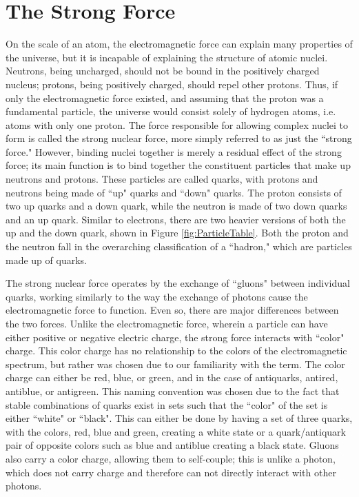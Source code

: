 \section{The Strong Force} \label{sec:StrongForce}
On the scale of an atom, the electromagnetic force can explain many properties of the universe, but it is incapable of explaining the structure of atomic nuclei. Neutrons, being uncharged, should not be bound in the positively charged nucleus; protons, being positively charged, should repel other protons. Thus, if only the electromagnetic force existed, and assuming that the proton was a fundamental particle, the universe would consist solely of hydrogen atoms, i.e. atoms with only one proton. The force responsible for allowing complex nuclei to form is called the strong nuclear force, more simply referred to as just the ``strong force." However, binding nuclei together is merely a residual effect of the strong force; its main function is to bind together the constituent particles that make up neutrons and protons. These particles are called quarks, with protons and neutrons being made of ``up" quarks and ``down" quarks. The proton consists of two up quarks and a down quark, while the neutron is made of two down quarks and an up quark. Similar to electrons, there are two heavier versions of both the up and the down quark, shown in Figure \ref{fig:ParticleTable}. Both the proton and the neutron fall in the overarching classification of a ``hadron," which are particles made up of quarks.\par 

	The strong nuclear force operates by the exchange of ``gluons" between individual quarks, working similarly to the way the exchange of photons cause the electromagnetic force to function. Even so, there are major differences between the two forces. Unlike the electromagnetic force, wherein a particle can have either positive or negative electric charge, the strong force interacts with ``color" charge. This color charge has no relationship to the colors of the electromagnetic spectrum, but rather was chosen due to our familiarity with the term.  The color charge can either be red, blue, or green, and in the case of antiquarks, antired, antiblue, or antigreen. This naming convention was chosen due to the fact that stable combinations of quarks exist in sets such that the ``color" of the set is either ``white" or ``black". This can either be done by having a set of three quarks, with the colors, red, blue and green, creating a white state or a quark/antiquark pair of opposite colors such as blue and antiblue creating a black state. Gluons also carry a color charge, allowing them to self-couple; this is unlike a photon, which does not carry charge and therefore can not directly interact with other photons.
	
